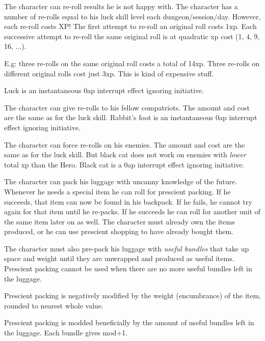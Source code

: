  The character can re-roll results he is not happy with. The character has a number of re-rolls equal to his luck skill level each dungeon/session/day. However, each re-roll costs XP! The first attempt to re-roll an original roll costs 1xp. Each successive attempt to re-roll the same original roll is at quadratic xp cost (1, 4, 9, 16, ...).

E.g: three re-rolls on the same original roll costs a total of 14xp. Three re-rolls on different original rolls cost just 3xp. This is kind of expensive stuff.

Luck is an instantaneous 0ap interrupt effect ignoring initiative.


 The character can give re-rolls to his fellow compatriots. The amount and cost are the same as for the luck skill.
Rabbit's foot is an instantaneous 0ap interrupt effect ignoring initiative.


 The character can force re-rolls on his enemies. The amount and cost are the same as for the luck skill. But black cat does not work on enemies with \emph{lower} total xp than the Hero.
Black cat is a 0ap interrupt effect ignoring initiative.



 The character can pack his luggage with uncanny knowledge of the future. Whenever he needs a special item he can roll for prescient packing. If he succeeds, that item can now be found in his backpack. If he fails, he cannot try again for that item until he re-packs. If he succeeds he can roll for another unit of the same item later on as well.
The character must already own the items produced, or he can use prescient shopping to have already bought them.

The character must also pre-pack his luggage with \emph{useful bundles} that take up space and weight until they are unwrapped and produced as useful items. Prescient packing cannot be used when there are no more useful bundles left in the luggage.

Prescient packing is negatively modified by the weight (encumbrance) of the item, rounded to nearest whole value.

Prescient packing is modded beneficially by the amount of useful bundles left in the luggage. Each bundle gives mod+1.

